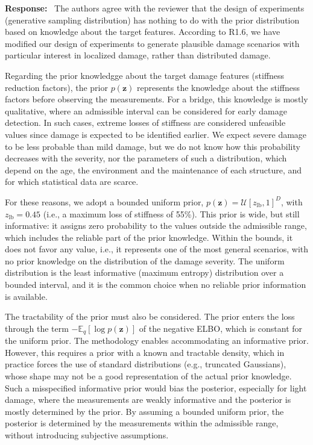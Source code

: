 \documentclass[11pt]{article}
\newenvironment{response}{\par\smallskip\noindent\color{resp}\textbf{Response:}\ }{\par}
\newcommand{\z}{\mathbf{z}}
\begin{document}
\begin{response}
The authors agree with the reviewer that the design of experiments (generative sampling distribution) has nothing to do with the prior distribution based on knowledge about the target features. 
According to R1.6, we have modified our design of experiments to generate plausible damage scenarios with particular interest in localized damage, rather than distributed damage. 

Regarding the prior knowledgge about the target damage features (stiffness reduction factors), the prior $p(\z)$ represents the knowledge about the stiffness factors before observing the measurements.
For a bridge, this knowledge is mostly qualitative, where an admissible interval can be considered for early damage detection. 
In such cases, extreme losses of stiffness are considered unfeasible values since damage is expected to be identified earlier. 
We expect severe damage to be less probable than mild damage, but we do not know how this probability decreases with the severity, nor the parameters of such a distribution, which depend on the age, the environment and the maintenance of each structure, and for which statistical data are scarce.

For these reasons, we adopt a bounded uniform prior, $p(\z)=\mathcal{U}[z_{\text{lb}},1]^{D}$, with $z_{\text{lb}}=0.45$ (i.e., a maximum loss of stiffness of 55\%).
This prior is wide, but still informative: it assigns zero probability to the values outside the admissible range, which includes the reliable part of the prior knowledge.
Within the bounds, it does not favor any value, i.e., it represents one of the most general scenarios, with no prior knowledge on the distribution of the damage severity.
The uniform distribution is the least informative (maximum entropy) distribution over a bounded interval, and it is the common choice when no reliable prior information is available.

The tractability of the prior must also be considered.
The prior enters the loss through the term $-\mathbb{E}_q[\log p(\z)]$ of the negative ELBO, which is constant for the uniform prior.
The methodology enables accommodating an informative prior. 
However, this requires a prior with a known and tractable density, which in practice forces the use of standard distributions (e.g., truncated Gaussians), whose shape may not be a good representation of the actual prior knowledge.
Such a misspecified informative prior would bias the posterior, especially for light damage, where the measurements are weakly informative  and the posterior is mostly determined by the prior.
By assuming a bounded uniform prior, the posterior is determined by the measurements within the admissible range, without introducing subjective assumptions.



\end{response}
\end{document}
